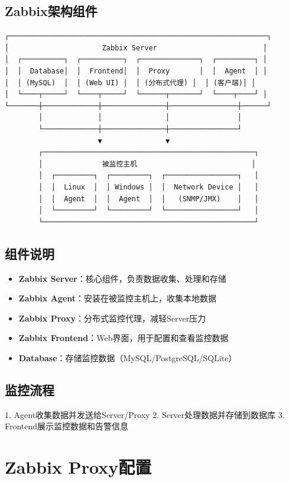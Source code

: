 \documentclass[12pt,UTF8]{ctexbook}
\begin{document}
\subsection*{Zabbix架构组件}
\begin{lstlisting}
┌─────────────────────────────────────────────────────────────┐
│                      Zabbix Server                         │
│  ┌──────────┐  ┌──────────┐  ┌──────────────┐  ┌─────────┐ │
│  │  Database│  │  Frontend│  │  Proxy       │  │  Agent  │ │
│  │ (MySQL)  │  │ (Web UI) │  │ (分布式代理) │  │ (客户端)│ │
│  └────┬─────┘  └────┬─────┘  └──────┬───────┘  └────┬────┘ │
└───────┼─────────────┼───────────────┼────────────────┼──────┘
        │             │               │                │
        └─────────────┼───────────────┼────────────────┘
                      ▼               ▼
        ┌──────────────────────────────────────────────────┐
        │              被监控主机                           │
        │  ┌─────────┐  ┌─────────┐  ┌─────────────────┐   │
        │  │  Linux  │  │ Windows │  │  Network Device │   │
        │  │  Agent  │  │  Agent  │  │   (SNMP/JMX)    │   │
        │  └─────────┘  └─────────┘  └─────────────────┘   │
        └──────────────────────────────────────────────────┘
\end{lstlisting}

\subsection*{组件说明}
\begin{itemize}
    \item \textbf{Zabbix Server}：核心组件，负责数据收集、处理和存储
    \item \textbf{Zabbix Agent}：安装在被监控主机上，收集本地数据
    \item \textbf{Zabbix Proxy}：分布式监控代理，减轻Server压力
    \item \textbf{Zabbix Frontend}：Web界面，用于配置和查看监控数据
    \item \textbf{Database}：存储监控数据（MySQL/PostgreSQL/SQLite）
\end{itemize}

\subsection*{监控流程}
1. Agent收集数据并发送给Server/Proxy
2. Server处理数据并存储到数据库
3. Frontend展示监控数据和告警信息

\section{Zabbix Proxy配置}
\label{sec:zabbix-proxy}
\end{document}

